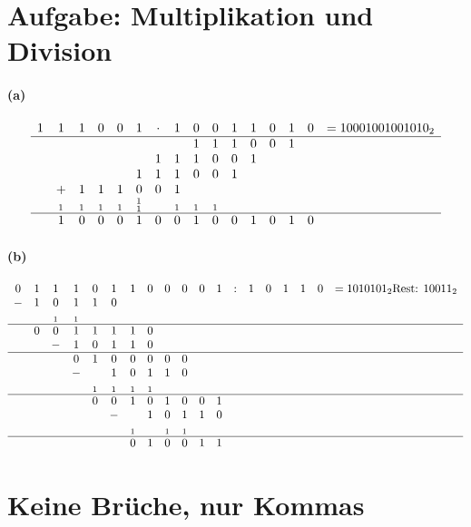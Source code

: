 \documentclass[a4paper]{article}
\begin{document}
\section{Aufgabe: Multiplikation und Division}
\paragraph{(a)}
\begin{align*}
	\begin{array} {cccccccccccccccc}
		1&1&1&0&0&1&\cdot&1&0&0&1&1&0&1&0& = 10001001001010_{2} \\
		\hline
		&&&&&&&&1&1&1&0&0&1&& \\
		&&&&&&1&1&1&0&0&1&&&& \\
		&&&&&1&1&1&0&0&1&&&&& \\
		&+&1&1&1&0&0&1&&&&&&&& \\
		&_1&_1&_1&_1&_1^1&&_1&_1&_1&&&&&& \\
		\hline
		&1&0&0&0&1&0&0&1&0&0&1&0&1&0
	\end{array}
\end{align*}

\paragraph{(b)}
\begin{align*}
	\begin{array} {ccccccccccccccccccc}
	0&1&1&1&0&1&1&0&0&0&0&1&:&1&0&1&1&0& = 1010101_2 \text{Rest: } 10011_2 \\
	-&1&0&1&1&0&&&&&&&&&&&&& \\
	&&_1&_1&&&&&&&&&&&&&&& \\
	\hline
	&0&0&1&1&1&1&0&&&&&&&&&&& \\
	&&-&1&0&1&1&0&&&&&&&&&&& \\
	\hline
	&&&0&1&0&0&0&0&0&&&&&&&&& \\
	&&&-&&1&0&1&1&0&&&&&&&&& \\
	&&&&_1&_1&_1&_1&&&&&&&&&&& \\
	\hline
	&&&&0&0&1&0&1&0&0&1&&&&&&& \\
	&&&&&-&&1&0&1&1&0&&&&&&& \\
	&&&&&&_1&&_1&_1&&&&&&&&& \\
	\hline
	&&&&&&0&1&0&0&1&1&&&&&&& \\
	\end{array}
\end{align*}


\section{Keine Brüche, nur Kommas}
\end{document}
